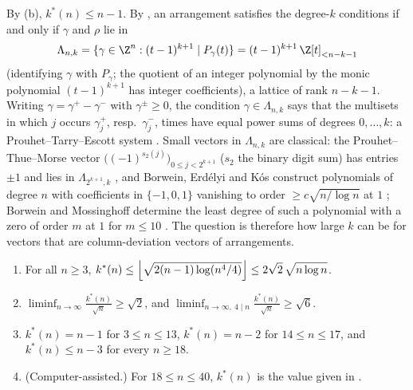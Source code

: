 By (b), $k^*(n)\le n-1$.
By , an arrangement satisfies the degree-$k$ conditions if and only if $\gamma$ and $\rho$ lie in
\[
\Lambda_{n,k}=\{\gamma\in\Z^{n}:(t-1)^{k+1}\mid P_\gamma(t)\}=(t-1)^{k+1}\,\Z[t]_{<n-k-1}
\]
(identifying $\gamma$ with $P_\gamma$; the quotient of an integer polynomial by the monic polynomial $(t-1)^{k+1}$ has integer coefficients), a lattice of rank $n-k-1$.
Writing $\gamma=\gamma^+-\gamma^-$ with $\gamma^\pm\ge0$, the condition $\gamma\in\Lambda_{n,k}$ says that the multisets in which $j$ occurs $\gamma^+_j$, resp.\ $\gamma^-_j$, times have equal power sums of degrees $0,\dots,k$: a Prouhet--Tarry--Escott system \cite{wright1959prouhet,borwein2002computational}.
Small vectors in $\Lambda_{n,k}$ are classical: the Prouhet--Thue--Morse vector $\bigl((-1)^{s_2(j)}\bigr)_{0\le j<2^{k+1}}$ ($s_2$ the binary digit sum) has entries $\pm1$ and lies in $\Lambda_{2^{k+1},k}$ \cite{wright1959prouhet,allouche1999ubiquitous}, and Borwein, Erd\'elyi and K\'os construct polynomials of degree $n$ with coefficients in $\{-1,0,1\}$ vanishing to order $\ge c\sqrt{n/\log n}$ at $1$ \cite[Thm.~2.7]{BEK1999}; Borwein and Mossinghoff determine the least degree of such a polynomial with a zero of order $m$ at $1$ for $m\le10$ \cite{borwein2000height}.
The question is therefore how large $k$ can be for vectors that are column-deviation vectors of arrangements.

\begin{theorem}
\label{thm:perm_threshold}
\leavevmode
\begin{enumerate}
\item[(a)] For all $n\ge3$, $\displaystyle k^{*}(n)\le\Bigl\lfloor\sqrt{2(n-1)\log(n^{4}/4)}\Bigr\rfloor\le 2\sqrt2\,\sqrt{n\log n}$.
\item[(b)] $\displaystyle\liminf_{n\to\infty}\frac{k^{*}(n)}{\sqrt n}\ge\sqrt2$, and $\displaystyle\liminf_{n\to\infty,\ 4\mid n}\frac{k^{*}(n)}{\sqrt n}\ge\sqrt6$.
\item[(c)] $k^{*}(n)=n-1$ for $3\le n\le13$, $k^{*}(n)=n-2$ for $14\le n\le17$, and $k^{*}(n)\le n-3$ for every $n\ge18$.
\item[(d)] \textup{(Computer-assisted.)} For $18\le n\le40$, $k^*(n)$ is the value given in .
\end{enumerate}
\end{theorem}

